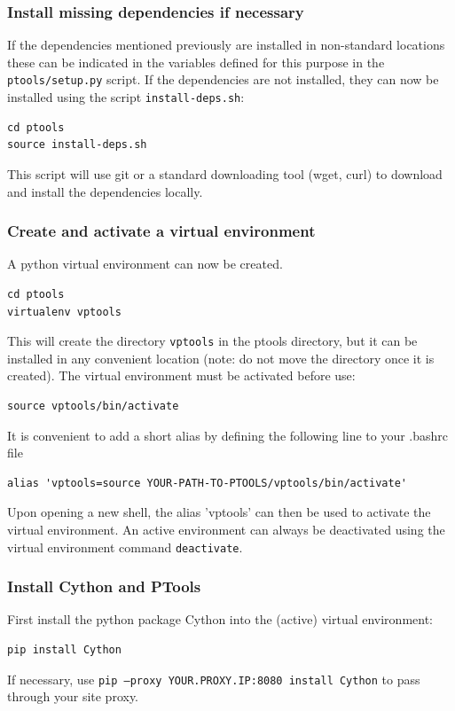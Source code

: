 \documentclass[12pt,a4paper]{article}
\begin{document}
\subsubsection*{Install missing dependencies if necessary}

If the dependencies mentioned previously are installed in non-standard locations these can be indicated in the variables defined for this purpose in the {\tt ptools/setup.py} script. If the dependencies are not installed, they can now be installed using the script {\tt install-deps.sh}:
\begin{verbatim}
cd ptools
source install-deps.sh
\end{verbatim}
This script will use git or a standard downloading tool (wget, curl) to download and install the dependencies locally.

\subsubsection*{Create and activate a virtual environment}
A python virtual environment can now be created.
\begin{verbatim}
cd ptools
virtualenv vptools
\end{verbatim}
This will create the directory {\tt vptools} in the ptools directory, but it can be installed in any convenient location (note: do not move the directory once it is created). The virtual environment must be activated before use:
\begin{verbatim}
source vptools/bin/activate
\end{verbatim}
It is convenient to add a short alias by defining the following line to your .bashrc file
\begin{verbatim}
alias 'vptools=source YOUR-PATH-TO-PTOOLS/vptools/bin/activate'
\end{verbatim}
Upon opening a new shell, the alias 'vptools' can then be used to activate the virtual environment. An active environment can always be deactivated using the virtual environment command {\tt deactivate}.

\subsubsection*{Install Cython and PTools}

First install the python package Cython into the (active) virtual environment:
\begin{verbatim}
pip install Cython
\end{verbatim}
If necessary, use {\tt pip --proxy YOUR.PROXY.IP:8080 install Cython} to pass through your site proxy.
\end{document}
